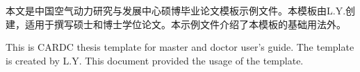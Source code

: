 ﻿\begin{AbstractCN}
本文是中国空气动力研究与发展中心硕博毕业论文模板示例文件。本模板由L.Y.创建，适用于撰写硕士和博士学位论文。本示例文件介绍了本模板的基础用法外。

\end{AbstractCN}

\begin{AbstractEN}
This is CARDC thesis template for master and doctor user's guide. 
The template is created by L.Y. This document provided the usage of the template.

\end{AbstractEN}
